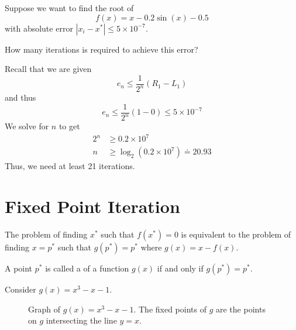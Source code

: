 \begin{example}
    Suppose we want to find the root of \[
        f(x) = x - 0.2 \sin(x) - 0.5
    \] with absolute error \( | x_i - x^\ast | \leq 5 \times 10^{-7} \).

    How many iterations is required to achieve this error?

    Recall that we are given \[
        e_n \leq \frac{1}{2^n} ( R_1 - L_1 )
    \] and thus \[
        e_n \leq \frac{1}{2^n} (1 - 0) \leq 5 \times 10^{-7}
    \] We solve for \( n \) to get \begin{align*}
        2^n
         & \geq 0.2 \times 10^7
        \\
        n
         & \geq \log_2 \left( 0.2 \times 10^7 \right) \doteq 20.93
    \end{align*}
    Thus, we need at least 21 iterations.
\end{example}

\section{Fixed Point Iteration}

\begin{note}
    The problem of finding \( x^\ast \) such that \( f(x^\ast) = 0 \) is equivalent to the problem of finding \( x = p^\ast \) such that \( g(p^\ast) = p^\ast \) where \( g(x) = x - f(x) \).
\end{note}

\begin{definition}
    A point \( p^\ast \) is called a  of a function \( g(x) \) if and only if \( g(p^\ast) = p^\ast \).
\end{definition}

\begin{example}
    Consider \( g(x) = x^3 - x - 1 \).
    \begin{figure}[H]
        \centering
        \caption{Graph of \( g(x) = x^3 - x - 1 \). The fixed points of \( g \) are the points on \( g \) intersecting the line \( y = x \).}
    \end{figure}
\end{example}

